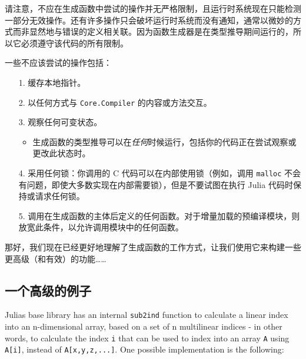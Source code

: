 请注意，不应在生成函数中尝试的操作并无严格限制，且运行时系统现在只能检测一部分无效操作。还有许多操作只会破坏运行时系统而没有通知，通常以微妙的方式而非显然地与错误的定义相关联。因为函数生成器是在类型推导期间运行的，所以它必须遵守该代码的所有限制。



一些不应该尝试的操作包括：



\begin{itemize}
\item[1. ] 缓存本地指针。


\item[2. ] 以任何方式与 \texttt{Core.Compiler} 的内容或方法交互。


\item[3. ] 观察任何可变状态。

\begin{itemize}
\item 生成函数的类型推导可以在\emph{任何}时候运行，包括你的代码正在尝试观察或更改此状态时。

\end{itemize}

\item[4. ] 采用任何锁：你调用的 C 代码可以在内部使用锁（例如，调用 \texttt{malloc} 不会有问题，即使大多数实现在内部需要锁），但是不要试图在执行 Julia 代码时保持或请求任何锁。


\item[5. ] 调用在生成函数的主体后定义的任何函数。对于增量加载的预编译模块，则放宽此条件，以允许调用模块中的任何函数。

\end{itemize}


那好，我们现在已经更好地理解了生成函数的工作方式，让我们使用它来构建一些更高级（和有效）的功能……



\hypertarget{13559476639927770222}{}


\subsection{一个高级的例子}



Julia{\textquotesingle}s base library has an internal \texttt{sub2ind} function to calculate a linear index into an n-dimensional array, based on a set of n multilinear indices - in other words, to calculate the index \texttt{i} that can be used to index into an array \texttt{A} using \texttt{A[i]}, instead of \texttt{A[x,y,z,...]}. One possible implementation is the following:




